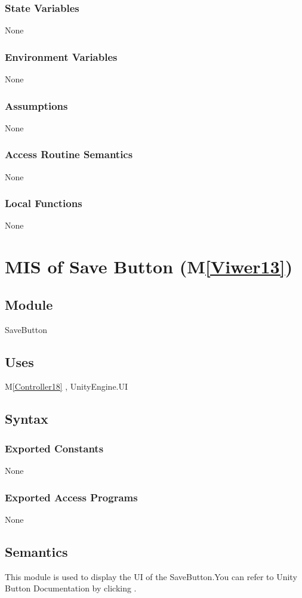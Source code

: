 \documentclass[12pt, titlepage]{article}
\newcommand{\mref}[1]{M\ref{#1}}
\begin{document}
\subsubsection{State Variables}
None
\subsubsection{Environment Variables}
None
\subsubsection{Assumptions}
None
\subsubsection{Access Routine Semantics}
None
\subsubsection{Local Functions}
None


\newpage

\section{MIS of Save Button (\mref{Viwer13})}

\subsection{Module}
SaveButton

\subsection{Uses}
\mref{Controller18}  , UnityEngine.UI

\subsection{Syntax}
\subsubsection{Exported Constants}
None
\subsubsection{Exported Access Programs}
None

\subsection{Semantics}
This module is used to display the UI of the SaveButton.You can refer to Unity Button Documentation by clicking \bref.
\end{document}
